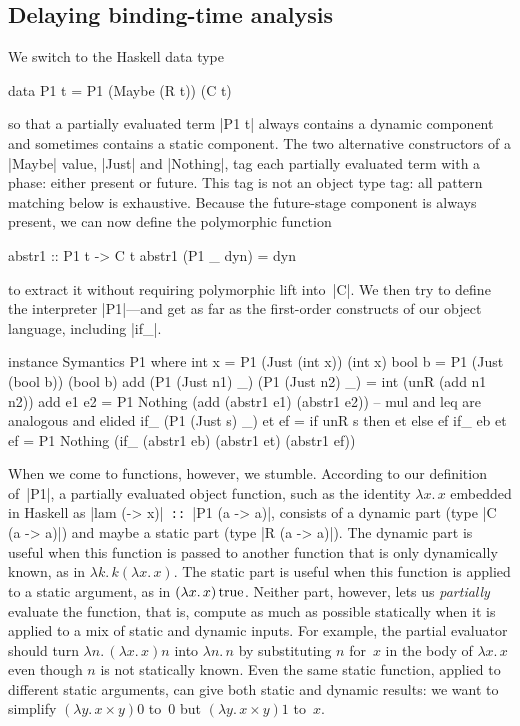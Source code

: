 \documentclass[preprint]{sigplanconf}
\newcommand{\fun}[1]{\mathopen{\lambda\mathord{#1}.\,}}
\newcommand{\True}{\mathinner{\mathrm{true}}}
\begin{document}
\subsection{Delaying binding-time analysis}
\label{S:PE-problem}

We switch to the Haskell data type
\begin{code}
data P1 t = P1 (Maybe (R t)) (C t)
\end{code}
so that a partially evaluated term |P1 t| always contains a dynamic
component and sometimes contains a static component.  The two
alternative constructors of a |Maybe| value, |Just| and |Nothing|,
tag each partially evaluated term with a phase: either present or
future.  This tag is not an object type tag: all pattern matching below
is exhaustive.  Because the future-stage component is always present, we
can now define the polymorphic function
\begin{code}
abstr1 :: P1 t -> C t
abstr1 (P1 _ dyn) = dyn
\end{code}
to extract it without requiring polymorphic lift into~|C|.  We then try
to define the interpreter |P1|---and get as far as the first-order
constructs of our object language, including |if_|.
\begin{code}
instance Symantics P1 where
  int  x = P1 (Just (int x)) (int x)
  bool b = P1 (Just (bool b)) (bool b)
  add (P1 (Just n1) _) (P1 (Just n2) _)
    = int (unR (add n1 n2))
  add e1 e2 = P1 Nothing
    (add (abstr1 e1) (abstr1 e2))
  -- mul and leq are analogous and elided
  if_ (P1 (Just s) _) et ef
    = if unR s then et else ef
  if_ eb et ef = P1 Nothing
    (if_ (abstr1 eb) (abstr1 et) (abstr1 ef))
\end{code}

When we come to functions, however, we stumble.  According to our
definition of~|P1|, a partially evaluated object function, such as the
identity $\fun{x}x$ embedded in Haskell as |lam (\x -> x)|\texttt{ ::
}|P1 (a -> a)|, consists of a dynamic part (type |C (a -> a)|) and
maybe a static part (type |R (a -> a)|).  The dynamic part is useful
when this function is passed to another function that is only
dynamically known, as in $\fun{k}k(\fun{x}x)$.  The static part is
useful when this function is applied to a static argument, as in
$(\fun{x}x)\True$.  Neither part, however, lets us \emph{partially}
evaluate the function, that is, compute as much as possible statically
when it is applied to a mix of static and dynamic inputs.  For example,
the partial evaluator should turn $\fun{n}(\fun{x}x)n$ into $\fun{n}n$
by substituting $n$ for~$x$ in the body of $\fun{x}x$ even though $n$ is
not statically known.  Even the same static function, applied to
different static arguments, can give both static and dynamic results: we
want to simplify $(\fun{y}x\times y)0$ to~$0$ but $(\fun{y}x\times y)1$
to~$x$.
\end{document}

